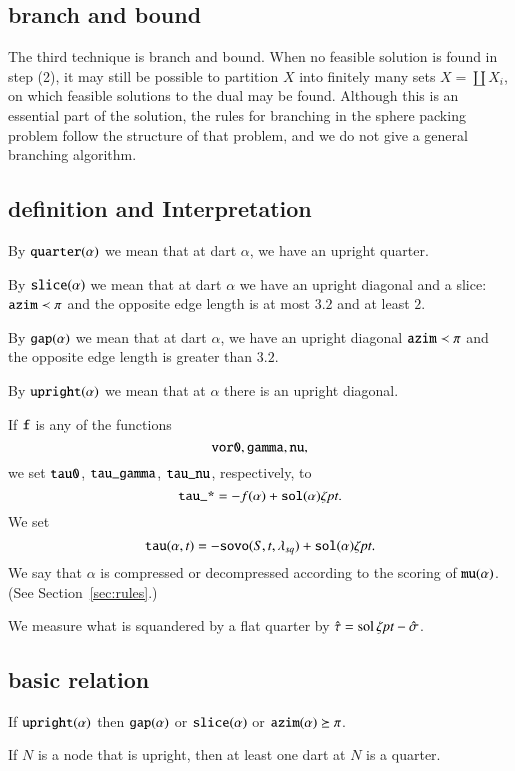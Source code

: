 \subsection{branch and bound}
The third technique is branch and bound.  When no feasible
solution is found in step (2), it may still be possible to
partition $X$ into finitely many sets $X = \coprod X_i$, on which
feasible solutions to the dual may be found.  Although this is an
essential part of the solution, the rules for branching in the
sphere packing problem follow the structure of that problem, and we do
not give a general branching algorithm.


\subsection{definition and Interpretation}

\begin{definition}[quarter]
By ${\operatorname{{\texttt{quarter}}}}(\alpha)$ we mean that at dart $\alpha$, we have
an upright quarter.
\end{definition}

\begin{definition}[slice]
By ${\operatorname{{\texttt{slice}}}}(\alpha)$ we mean that at dart $\alpha$ we have an upright
diagonal and a slice: ${\operatorname{{\texttt{azim}}}}\prec \pi$ and
the opposite edge length is at most $3.2$ and at least $2$.
\end{definition}

\begin{definition}[gap]
By ${\operatorname{{\texttt{gap}}}}(\alpha)$ we mean that at dart $\alpha$, we have an
upright diagonal ${\operatorname{{\texttt{azim}}}}\prec \pi$ and the opposite edge length
is greater than $3.2$.
\end{definition}

\begin{definition}[upright]
By ${\operatorname{{\texttt{upright}}}}(\alpha)$ we mean that at $\alpha$ there is an upright
diagonal.
\end{definition}


If ${\operatorname{{\texttt{f}}}}$ is any of the
functions
    $${\operatorname{{\texttt{vor0}}}},{\operatorname{{\texttt{gamma}}}}, {\operatorname{{\texttt{nu}}}},$$
we set ${\operatorname{{\texttt{tau0}}}}$, ${\operatorname{{\texttt{tau\_gamma}}}}$,
${\operatorname{{\texttt{tau\_nu}}}}$, respectively,
to
    $${\operatorname{{\texttt{tau\_*}}}} = -f(\alpha) +{\operatorname{{\texttt{sol}}}}(\alpha)\zeta\hbox{\it pt}.$$
We set
    $$
    {\operatorname{{\texttt{tau}}}}(\alpha,t) = -
    {\operatorname{{\texttt{sovo}}}}(S,t,\lambda_{sq})+{\operatorname{{\texttt{sol}}}}(\alpha)\zeta\hbox{\it pt}.
    $$
We say that $\alpha$ is compressed or decompressed 
according to the scoring of ${\operatorname{{\texttt{mu}}}}(\alpha)$.  (See
Section~\ref{sec:rules}.)

We  measure what is squandered by a flat quarter by $\hat\tau =
\operatorname{sol}\zeta\hbox{\it pt} - \hat\sigma$.


\subsection{basic relation}

\begin{lemma} If ${\operatorname{{\texttt{upright}}}}(\alpha)$ then ${\operatorname{{\texttt{gap}}}}(\alpha)$ or
${\operatorname{{\texttt{slice}}}}(\alpha)$ or ${\operatorname{{\texttt{azim}}}}(\alpha) \succeq \pi$.
\end{lemma}


\begin{lemma}  If $N$ is a node that is upright, then at least
one dart at $N$ is a quarter.
\end{lemma}



